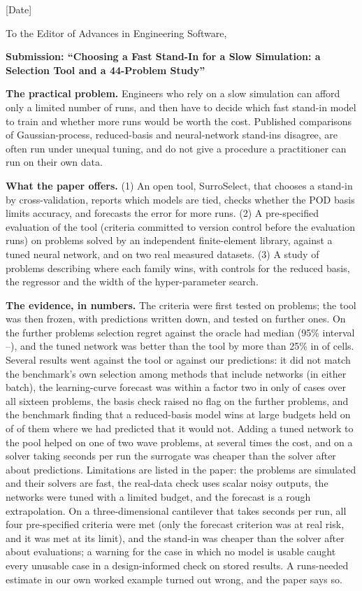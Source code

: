 \documentclass[11pt]{article}
\begin{document}
[Date]

To the Editor of Advances in Engineering Software,

\textbf{Submission: ``Choosing a Fast Stand-In for a Slow Simulation: a Selection Tool and a 44-Problem Study''}

\textbf{The practical problem.} Engineers who rely on a slow simulation can afford only a limited number of runs, and then have to decide which fast stand-in model to train and whether more runs would be worth the cost. Published comparisons of Gaussian-process, reduced-basis and neural-network stand-ins disagree, are often run under unequal tuning, and do not give a procedure a practitioner can run on their own data.

\textbf{What the paper offers.} (1) An open tool, SurroSelect, that chooses a stand-in by cross-validation, reports which models are tied, checks whether the POD basis limits accuracy, and forecasts the error for more runs. (2) A pre-specified evaluation of the tool (criteria committed to version control before the evaluation runs) on \NTpProblems{} problems solved by an independent finite-element library, against a tuned neural network, and on two real measured datasets. (3) A study of \NAllProblems{} problems describing where each family wins, with controls for the reduced basis, the regressor and the width of the hyper-parameter search.

\textbf{The evidence, in numbers.} The criteria were first tested on \NTpProblems{} problems; the tool was then frozen, with predictions written down, and tested on \NTpProblems{} further ones. On the further problems selection regret against the oracle had median \SvSoneMedian{} (95\% interval \SvSoneLo--\SvSoneHi), and the tuned network was better than the tool by more than 25\% in \SvSfourK{} of \SvSfourN{} cells. Several results went against the tool or against our predictions: it did not match the benchmark's own selection among methods that include networks (in either batch), the learning-curve forecast was within a factor two in only \SvpBoneShare{} of \SvpBoneN{} cases over all sixteen problems, the basis check raised no flag on the further problems, and the benchmark finding that a reduced-basis model wins at large budgets held on \SvPtK{} of \SvPtN{} of them where we had predicted that it would not. Adding a tuned network to the pool helped on one of two wave problems, at several times the cost, and on a solver taking \SvETsim{} seconds per run the surrogate was cheaper than the solver after about \SvEBreakTwofiftysix{} predictions. Limitations are listed in the paper: the problems are simulated and their solvers are fast, the real-data check uses scalar noisy outputs, the networks were tuned with a limited budget, and the forecast is a rough extrapolation. On a three-dimensional cantilever that takes \SeTsim{} seconds per run, all four pre-specified criteria were met (only the forecast criterion was at real risk, and it was met at its limit), and the stand-in was cheaper than the solver after about \SeBreakWith{} evaluations; a warning for the case in which no model is usable caught every unusable case in a design-informed check on stored results. A runs-needed estimate in our own worked example turned out wrong, and the paper says so.
\end{document}
